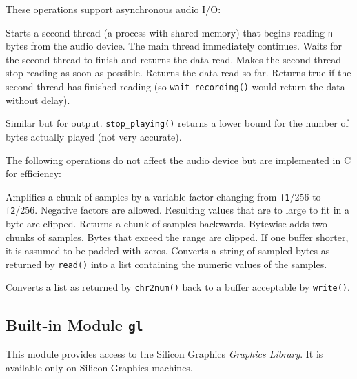 These operations support asynchronous audio I/O:
\begin{description}
Starts a second thread (a process with shared memory) that begins reading
{\tt n}
bytes from the audio device.
The main thread immediately continues.
Waits for the second thread to finish and returns the data read.
Makes the second thread stop reading as soon as possible.
Returns the data read so far.
Returns true if the second thread has finished reading (so
{\tt wait\_recording()} would return the data without delay).
\item[{\tt start\_playing(chunk)}, {\tt wait\_playing()},
{\tt stop\_playing()}, {\tt poll\_playing()}]
\begin{sloppypar}
Similar but for output.
{\tt stop\_playing()}
returns a lower bound for the number of bytes actually played (not very
accurate).
\end{sloppypar}
\end{description}

The following operations do not affect the audio device but are
implemented in C for efficiency:
\begin{description}
Amplifies a chunk of samples by a variable factor changing from
{\tt f1}/256 to {\tt f2}/256.
Negative factors are allowed.
Resulting values that are to large to fit in a byte are clipped.
Returns a chunk of samples backwards.
Bytewise adds two chunks of samples.
Bytes that exceed the range are clipped.
If one buffer shorter, it is assumed to be padded with zeros.
Converts a string of sampled bytes as returned by {\tt read()} into
a list containing the numeric values of the samples.
\begin{sloppypar}
Converts a list as returned by
{\tt chr2num()}
back to a buffer acceptable by
{\tt write()}.
\end{sloppypar}
\end{description}

\subsection{Built-in Module {\tt gl}}

This module provides access to the Silicon Graphics
{\em Graphics Library}.
It is available only on Silicon Graphics machines.

